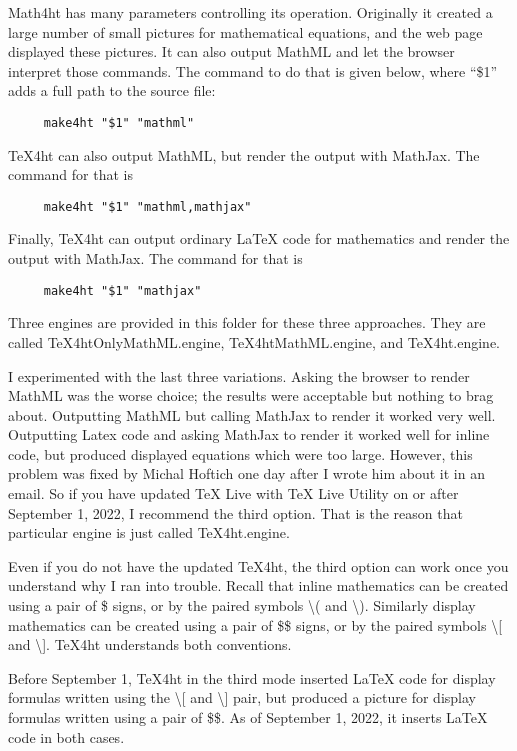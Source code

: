 \documentclass[11pt, oneside]{article}   	%
\begin{document}
Math4ht has many parameters controlling its operation. Originally it created a large number of small pictures for  mathematical equations, and the web page displayed these pictures. It can also output MathML and let the browser interpret those commands. The command to do that is given below, where ``\$1'' adds a full path to the source file:
\begin{verbatim}
     make4ht "$1" "mathml"
\end{verbatim}
TeX4ht can also output MathML, but render the output with MathJax. The command for that is
\begin{verbatim}
     make4ht "$1" "mathml,mathjax"
\end{verbatim}
Finally, TeX4ht can output ordinary LaTeX code for mathematics and render the output with MathJax. The command for that is
\begin{verbatim}
     make4ht "$1" "mathjax"
\end{verbatim}
Three engines are provided in this folder for these three approaches. They are called TeX4htOnlyMathML.engine,
TeX4htMathML.engine, and TeX4ht.engine. 


I experimented with the last three variations.
Asking the browser to render MathML was the worse choice; the results were acceptable but nothing to brag about. Outputting MathML but calling MathJax to render it worked very well. Outputting Latex code and asking MathJax to render it worked well for inline code, but produced displayed equations which were too large.
However, this problem was fixed by Michal Hoftich one day after I wrote him about it in an email. So if you have updated TeX Live with TeX Live Utility on or after September 1, 2022, I recommend the third option. That is the reason that particular engine is just called TeX4ht.engine.

Even if you do not have the updated TeX4ht, the third option can work once you understand why I ran into trouble. Recall that inline mathematics can be created using a pair of \$ signs, or by the paired symbols \textbackslash ( and \textbackslash ). 
Similarly display mathematics can be created using a pair of \$\$ signs, or by the paired symbols  \textbackslash [ and \textbackslash ]. TeX4ht  understands both conventions. 

Before September 1, TeX4ht in the third mode  inserted LaTeX code for display formulas written using the \textbackslash [ and \textbackslash ] pair, but produced a picture for display formulas written using a pair of \$\$. As of September 1, 2022, it inserts LaTeX code in both cases.
\end{document}
